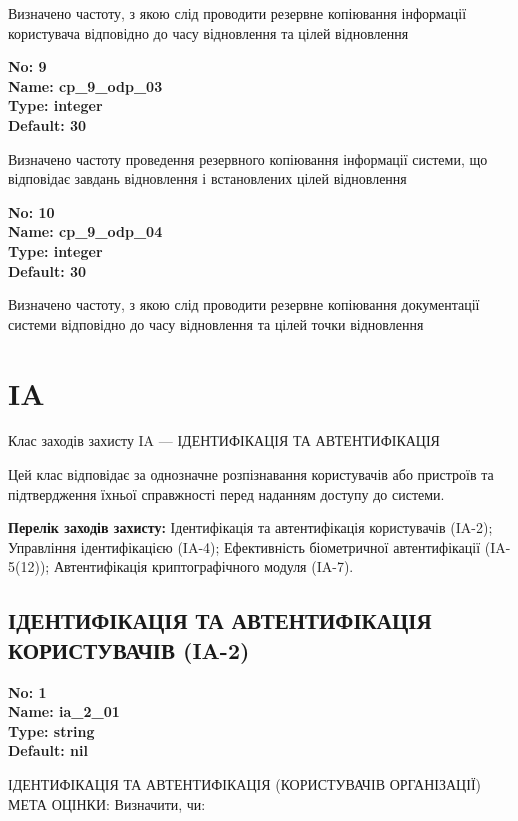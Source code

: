 \documentclass{article}
\begin{document}
{\footnotesize Визначено частоту, з якою слід проводити резервне копіювання інформації користувача відповідно до часу відновлення та цілей відновлення}


{\footnotesize\bfseries
No: 9\\
Name: cp\_\allowbreak{}9\_\allowbreak{}odp\_\allowbreak{}03\\
Type: integer\\
Default: 30
}

{\footnotesize Визначено частоту проведення резервного копіювання інформації системи, що відповідає завдань відновлення і встановлених цілей відновлення}


{\footnotesize\bfseries
No: 10\\
Name: cp\_\allowbreak{}9\_\allowbreak{}odp\_\allowbreak{}04\\
Type: integer\\
Default: 30
}

{\footnotesize Визначено частоту, з якою слід проводити резервне копіювання документації системи відповідно до часу відновлення та цілей точки відновлення}




\section{IA}
Клас заходів захисту IA --- ІДЕНТИФІКАЦІЯ ТА АВТЕНТИФІКАЦІЯ

Цей клас відповідає за однозначне розпізнавання користувачів або пристроїв та підтвердження їхньої справжності перед наданням доступу до системи.

\textbf{Перелік заходів захисту:} Ідентифікація та автентифікація користувачів (IA-2); Управління ідентифікацією (IA-4); Ефективність біометричної автентифікації (IA-5(12)); Автентифікація криптографічного модуля (IA-7).

\subsection{ІДЕНТИФІКАЦІЯ ТА АВТЕНТИФІКАЦІЯ КОРИСТУВАЧІВ (IA-2)}


\vspace{10pt}
{\footnotesize\bfseries
No: 1\\
Name: ia\_\allowbreak{}2\_\allowbreak{}01\\
Type: string\\
Default: nil
}

{\footnotesize ІДЕНТИФІКАЦІЯ ТА АВТЕНТИФІКАЦІЯ (КОРИСТУВАЧІВ ОРГАНІЗАЦІЇ) МЕТА ОЦІНКИ: Визначити, чи:}
\end{document}
